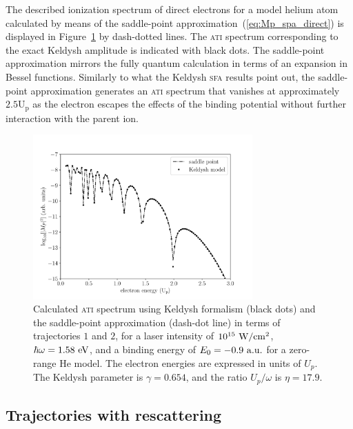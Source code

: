 The described ionization spectrum of direct electrons for a model
helium atom calculated by means of the saddle-point
approximation~(\ref{eq:Mp_spa_direct}) is displayed in
Figure~\ref{fig:ati_direct} by dash-dotted lines. The \textsc{ati}
spectrum corresponding to the exact Keldysh amplitude is indicated
with black dots. The saddle-point approximation mirrors the fully
quantum calculation in terms of an expansion in Bessel
functions. Similarly to what the Keldysh \textsc{sfa} results point
out, the saddle-point approximation generates an \textsc{ati} spectrum
that vanishes at approximately $2.5 \mathrm{U_{p}}$ as the electron
escapes the effects of the binding potential without further
interaction with the parent ion.

\begin{figure}
  \centering
  \includegraphics[width = 0.75\textwidth]{figures/ch_ATI_SPA/direct/SPvsKeldysh_spa_discrete}
  \caption{Calculated \textsc{ati} spectrum using Keldysh formalism
    (black dots) and the saddle-point approximation (dash-dot line) in
    terms of trajectories $1$ and $2$, for a laser intensity of
    $10^{15}\ \rm{W/cm^{2}}$, $\hbar\omega = 1.58\ \rm{eV}$, and a
    binding energy of $E_{0} = -0.9\ \rm{a.u.}$ for a zero-range He
    model. The electron energies are expressed in units of
    $U_{p}$. The Keldysh parameter is $\gamma = 0.654$, and the ratio
    $U_{p}/\omega$ is $\eta = 17.9$.}
  \label{fig:ati_direct}
\end{figure}


\subsection{\label{sec:spa_resc} Trajectories with rescattering}

